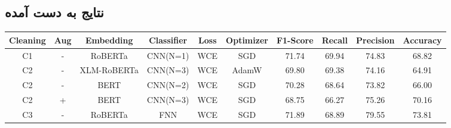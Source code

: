\subsection{نتایج به دست آمده}

\begin{table*}[h!]
	\centering
	\scriptsize
	\begin{tabular}{c  |c |c c  c  c|c c  c  c}
		\hline
		Cleaning & Aug &  Embedding&Classifier & Loss & Optimizer &  F1-Score & Recall & Precision& Accuracy\\
		\hline

		
		C1 & - &RoBERTa&  CNN(N=1)& WCE & SGD &  71.74 & 69.94 & 74.83& 68.82\\
\hline
\hline
		C2 & - & XLM-RoBERTa  & CNN(N=3)& WCE & AdamW &  69.80 & 69.38 & 74.16&64.91\\ 
		C2 & - & BERT& CNN(N=2)& WCE & SGD &  70.28 & 68.64 & 73.82&66.00\\
		
		C2 & + & BERT& CNN(N=3) &  WCE&SGD & 68.75 & 66.27 & 75.26& 70.16\\
		
\hline
\hline
		C3 & - & RoBERTa&  FNN & WCE & SGD & 71.89 & 68.89 & 79.55&73.81\\
		

\end{tabular}
\end{table*}
